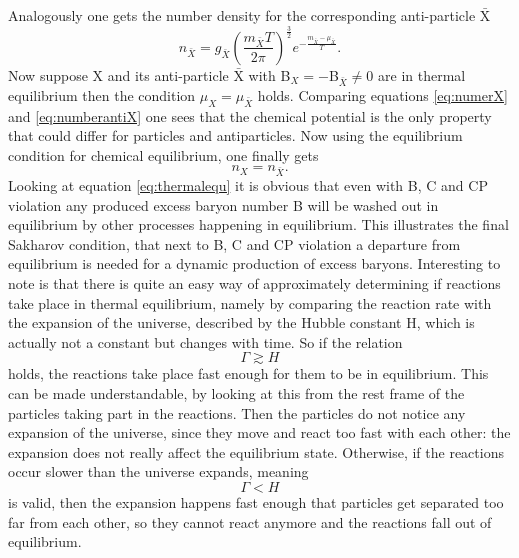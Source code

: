 Analogously one gets the number density for the corresponding anti-particle $\bar{\text{X}}$
\begin{equation}
	n_{\bar{X}}=g_{\bar{X}}\left(\frac{m_{\bar{X}}T}{2\pi}\right)^\frac{3}{2}e^{-\frac{m_{\bar{X}}-\mu_{\bar{X}}}{T}}.
\label{eq:numberantiX}
\end{equation}
Now suppose X and its anti-particle $\bar{\text{X}}$  with B$_X=-$B$_{\bar{X}}\neq0$ are in thermal equilibrium then the condition $\mu_X=\mu_{\bar{X}}$ holds. Comparing equations \eqref{eq:numerX} and \eqref{eq:numberantiX} one sees that the chemical potential is the only property that could differ for particles and antiparticles. Now using the equilibrium condition for chemical equilibrium, one finally gets
\begin{equation}
	n_X=n_{\bar{X}}.
	\label{eq:thermalequ}
\end{equation}
Looking at equation \eqref{eq:thermalequ} it is obvious that even with B, C and CP violation any produced excess baryon number B will be washed out in equilibrium by other processes happening in equilibrium. \newline\indent
This illustrates the final Sakharov condition, that next to B, C and CP violation a departure from equilibrium is needed for a dynamic production of excess baryons. \newline\indent
Interesting to note is that there is quite an easy way of approximately determining if reactions take place in thermal equilibrium, namely by comparing the reaction rate with the expansion of the universe, described by the Hubble constant H, which is actually not a constant but changes with time. So if the relation 
\begin{equation}
	\Gamma\gtrsim H
	\label{eq:rate_g_hubble}
\end{equation}
holds, the reactions take place fast enough for them to be in equilibrium. This can be made understandable, by looking at this from the rest frame of the particles taking part in the reactions. Then the particles do not notice any expansion of the universe, since they move and react too fast with each other: the expansion does not really affect the equilibrium state. \newline\indent
Otherwise, if the reactions occur slower than the universe expands, meaning
\begin{equation}
	\Gamma<H
	\label{eq:rate_s_hubble}
\end{equation}
is valid, then the expansion happens fast enough that particles get separated too far from each other, so they cannot react anymore and the reactions fall out of equilibrium.
